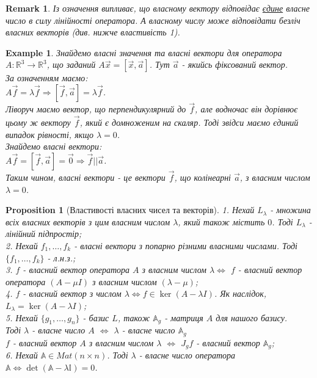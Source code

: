 \documentclass[a4paper, 10pt]{article}
\theoremstyle{theoremdd}
\newtheorem{example}[theorem]{Example}
\newtheorem{proposition}[theorem]{Proposition}
\newtheorem{remark}[theorem]{Remark}
\begin{document}
\begin{remark}
Із означення випливає, що власному вектору відповідає \underline{єдине} власне число в силу лінійності оператора. А власному числу може відповідати безліч власних векторів (див. нижче властивість 1).
\end{remark}

\begin{example}
Знайдемо власні значення та власні вектори для оператора $A: \mathbb{R}^3 \to \mathbb{R}^3$, що заданий $A\vec{x} = [\vec{x}, \vec{a}]$. Тут $\vec{a}$ - якийсь фіксований вектор.\\
За означенням маємо:\\
$A\vec{f} = \lambda \vec{f} \Rightarrow [\vec{f},\vec{a}] = \lambda \vec{f}$.\\
Ліворуч маємо вектор, що перпендикулярний до $\vec{f}$, але водночас він дорівнює цьому ж вектору $\vec{f}$, який є домноженим на скаляр. Тоді звідси маємо єдиний випадок рівності, якщо $\lambda = 0$.\\
Знайдемо власні вектори:\\
$A\vec{f} = [\vec{f}, \vec{a}] = \vec{0} \Rightarrow \vec{f} || \vec{a}$.\\
Таким чином, власні вектори - це вектори $\vec{f}$, що колінеарні $\vec{a}$, з власним числом $\lambda = 0$.
\end{example}

\begin{proposition}[Властивості власних чисел та векторів]
1. Нехай $L_{\lambda}$ - множина всіх власних векторів з цим власним числом $\lambda$, який також містить $0$. Тоді $L_{\lambda}$ - лінійний підпростір;\\
2. Нехай $f_1,\dots,f_k$ - власні вектори з попарно різними власними числами. Тоді $\{f_1,\dots,f_k\}$ - л.н.з.;\\
3. $f$ - власний вектор оператора $A$ з власним числом $\lambda \iff$ $f$ - власний вектор оператора $(A - \mu I)$ з власним числом $(\lambda - \mu)$;\\
4. $f$ - власний вектор з числом $\lambda \iff f \in \ker(A-\lambda I)$. Як наслідок, $L_{\lambda} = \ker(A-\lambda I)$;\\
5. Нехай $\{g_1,\dots,g_n\}$ - базис $L$, також $\mathbb{A}_g$ - матриця $A$ для нашого базису.\\
Тоді $\lambda$ - власне число $A$ $\iff$ $\lambda$ - власне число $\mathbb{A}_g$\\
$f$ - власний вектор $A$ з власним числом $\lambda$ $\iff$ $J_g f$ - власний вектор $\mathbb{A}_g$;\\
6. Нехай $\mathbb{A} \in Mat(n \times n)$. Тоді $\lambda$ - власне число оператора $\mathbb{A} \iff \det (\mathbb{A} - \lambda \mathbb{I}) = 0$.
\end{proposition}
\end{document}
